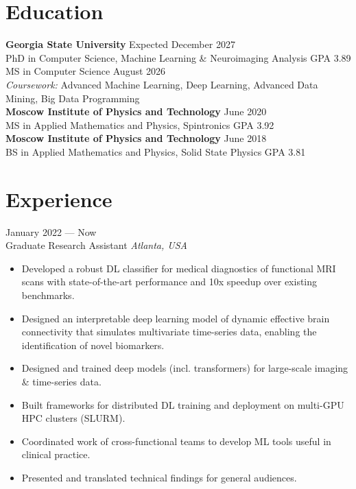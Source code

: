 \documentclass[11pt,a4paper]{article}
\begin{document}
\section*{Education}
\noindent\textbf{Georgia State University} \hfill Expected December 2027\\
PhD in Computer Science, Machine Learning \& Neuroimaging Analysis \hfill GPA 3.89\\
MS in Computer Science \hfill August 2026\\
{\small\textit{Coursework:} Advanced Machine Learning, Deep Learning, Advanced Data Mining, Big Data Programming}\\[0.3em]
\textbf{Moscow Institute of Physics and Technology} \hfill June 2020\\
MS in Applied Mathematics and Physics, Spintronics \hfill GPA 3.92\\[0.3em]
\textbf{Moscow Institute of Physics and Technology} \hfill June 2018\\
BS in Applied Mathematics and Physics, Solid State Physics \hfill GPA 3.81

\section*{Experience}
 \hfill January 2022 --- Now\\
Graduate Research Assistant \hfill \textit{Atlanta, USA}\\
[-2em]
\begin{itemize}[leftmargin=*,noitemsep]
    \item Developed a robust DL classifier for medical diagnostics of functional MRI scans with state-of-the-art performance and 10x speedup over existing benchmarks.
    \item Designed an interpretable deep learning model of dynamic effective brain connectivity that simulates multivariate time-series data, enabling the identification of novel biomarkers.
    \item Designed and trained deep models (incl. transformers) for large-scale imaging \& time-series data.
    \item Built frameworks for distributed DL training and deployment on multi-GPU HPC clusters (SLURM).
    \item Coordinated work of cross-functional teams to develop ML tools useful in clinical practice.
    \item Presented and translated technical findings for general audiences.
\end{itemize}
\end{document}
